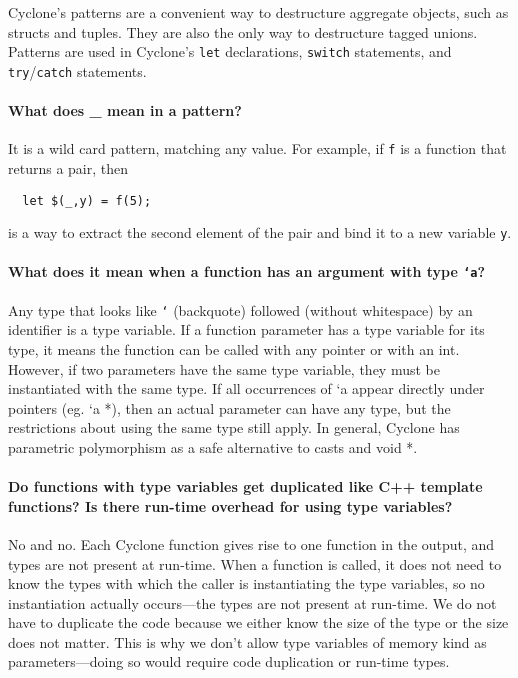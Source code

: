 Cyclone's patterns are a convenient way to destructure aggregate
objects, such as structs and tuples.  They are also the only way to
destructure tagged unions.  Patterns are used in Cyclone's
\texttt{let} declarations, \texttt{switch} statements, and
\texttt{try}/\texttt{catch} statements.

\paragraph{What does _ mean in a pattern?}

It is a wild card pattern, matching any value.  For example, if
\texttt{f} is a function that returns a pair, then
\begin{verbatim}
  let $(_,y) = f(5); 
\end{verbatim} %
is a way to extract the second element of the pair and bind it to a
new variable \texttt{y}.

\paragraph{What does it mean when a function has an argument with type \texttt{`a}?}

Any type that looks like \texttt{`} (backquote) followed (without
whitespace) by an identifier is a type variable.  If a function
parameter has a type variable for its type, it means the function can
be called with any pointer or with an int.  However, if two parameters
have the same type variable, they must be instantiated with the same
type. If all occurrences of `a appear directly under pointers (eg. `a
*), then an actual parameter can have any type, but the restrictions
about using the same type still apply.  In general, Cyclone has
parametric polymorphism as a safe alternative to casts and void *.

\paragraph{Do functions with type variables get duplicated like C++
  template functions?  Is there run-time overhead for using type
  variables?}

No and no.  Each Cyclone function gives rise to one function in the
output, and types are not present at run-time.  When a function is
called, it does not need to know the types with which the caller is
instantiating the type variables, so no instantiation actually
occurs---the types are not present at run-time.  We do not have to
duplicate the code because we either know the size of the type or the
size does not matter.  This is why we don't allow type variables of
memory kind as parameters---doing so would require code duplication or
run-time types.


